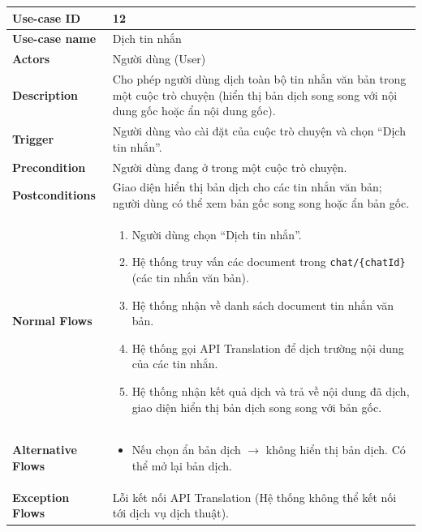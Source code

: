 \documentclass[a4paper, 12pt]{article}
\begin{document}
	\begin{longtable}{|p{3.5cm}|p{12cm}|}
		\hline
		\textbf{Use-case ID} & 12 \\
		\hline
		\textbf{Use-case name} & Dịch tin nhắn \\
		\hline
		\textbf{Actors} & Người dùng (User) \\
		\hline
		\textbf{Description} & Cho phép người dùng dịch toàn bộ tin nhắn văn bản trong một cuộc trò chuyện (hiển thị bản dịch song song với nội dung gốc hoặc ẩn nội dung gốc). \\
		\hline
		\textbf{Trigger} & Người dùng vào cài đặt của cuộc trò chuyện và chọn “Dịch tin nhắn”. \\
		\hline
		\textbf{Precondition} & Người dùng đang ở trong một cuộc trò chuyện. \\
		\hline
		\textbf{Postconditions} & Giao diện hiển thị bản dịch cho các tin nhắn văn bản; người dùng có thể xem bản gốc song song hoặc ẩn bản gốc. \\
		\hline
		\textbf{Normal Flows} & 
		\begin{enumerate}[leftmargin=1.5em]
			\item Người dùng chọn “Dịch tin nhắn”.
			\item Hệ thống truy vấn các document trong \texttt{chat/\{chatId\}} (các tin nhắn văn bản).
			\item Hệ thống nhận về danh sách document tin nhắn văn bản.
			\item Hệ thống gọi API Translation để dịch trường nội dung của các tin nhắn.
			\item Hệ thống nhận kết quả dịch và trả về nội dung đã dịch, giao diện hiển thị bản dịch song song với bản gốc.
		\end{enumerate} \\
		\hline
		\textbf{Alternative Flows} & 
		\begin{itemize}[leftmargin=2.5em, labelsep=0.5em]
			\item[5.1.] Nếu chọn ẩn bản dịch $\rightarrow$ không hiển thị bản dịch. Có thể mở lại bản dịch.
		\end{itemize} \\
		\hline
		\textbf{Exception Flows} & Lỗi kết nối API Translation (Hệ thống không thể kết nối tới dịch vụ dịch thuật). \\
		\hline
	\end{longtable}
	\vspace{0.5cm}
	
\end{document}
